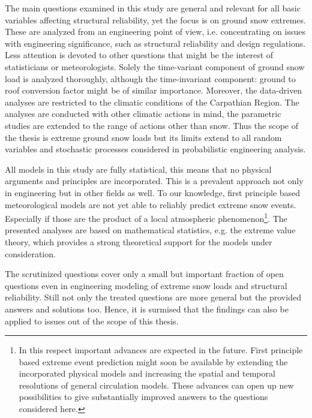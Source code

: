 The main questions examined in this study are general and relevant for all basic variables affecting structural reliability, yet the focus is on ground snow extremes. These are analyzed from an engineering point of view, i.e. concentrating on issues with engineering significance, such as structural reliability and design regulations. Less attention is devoted to other questions that might be the interest of statisticians or meteorologists. Solely the time-variant component of ground snow load is analyzed thoroughly, although the time-invariant component: ground to roof conversion factor might be of similar importance. Moreover, the data-driven analyses are restricted to the climatic conditions of the Carpathian Region. The analyses are conducted with other climatic actions in mind, the parametric studies are extended to the range of actions other than snow. Thus the scope of the thesis is extreme ground snow loads but its limits extend to all random variables and stochastic processes considered in probabilistic engineering analysis.

All models in this study are fully statistical, this means that no physical arguments and principles are incorporated. This is a prevalent approach not only in engineering but in other fields as well. To our knowledge, first principle based meteorological models are not yet able to reliably predict extreme snow events. Especially if those are the product of a local atmospheric phenomenon\footnote{In this respect important advances are expected in the future. First principle based extreme event prediction might soon be available by extending the incorporated physical models and increasing the spatial and temporal resolutions of general circulation models. These advances can open up new possibilities to give substantially improved answers to the questions considered here.}. The presented analyses are based on mathematical statistics, e.g. the extreme value theory, which provides a strong theoretical support for the models under consideration. 

The scrutinized questions cover only a small but important fraction of open questions even in engineering modeling of extreme snow loads and structural reliability. Still not only the treated questions are more general but the provided answers and solutions too. Hence, it is surmised that the findings can also be applied to issues out of the scope of this thesis.


